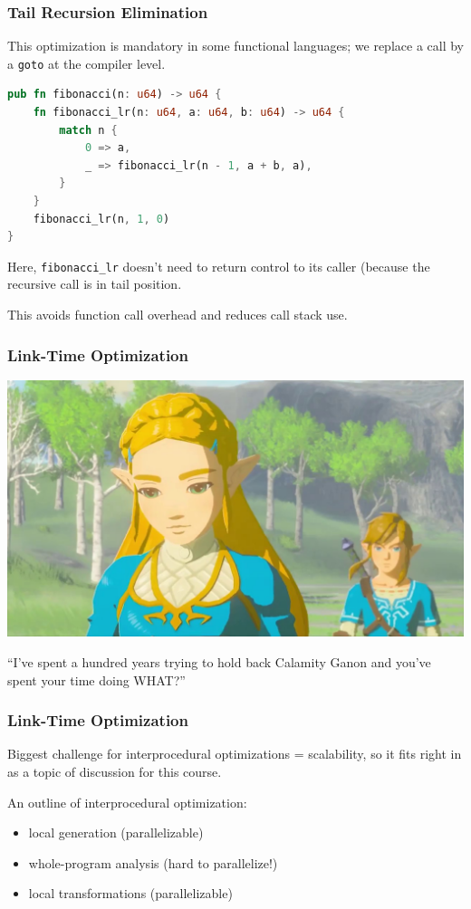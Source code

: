 \begin{frame}[fragile]
\frametitle{Tail Recursion Elimination}

This optimization is mandatory in some functional languages; we replace a call by a {\tt goto} at the compiler level.

{\small
\begin{lstlisting}[language=Rust]
pub fn fibonacci(n: u64) -> u64 {
    fn fibonacci_lr(n: u64, a: u64, b: u64) -> u64 {
        match n {
            0 => a,
            _ => fibonacci_lr(n - 1, a + b, a),
        }
    }
    fibonacci_lr(n, 1, 0)
}
\end{lstlisting}
}
Here, \texttt{fibonacci\_lr} doesn't need to return control to its caller
(because the recursive call is in tail position. 

This avoids function call overhead and reduces call stack use.
\end{frame}


\begin{frame}
\frametitle{Link-Time Optimization}

\begin{center}
	\includegraphics[width=\textwidth]{images/sadzelda.jpg}
\end{center}

``I've spent a hundred years trying to hold back Calamity Ganon and you've spent your time doing WHAT?''

\end{frame}


\begin{frame}
\frametitle{Link-Time Optimization}


Biggest challenge for interprocedural optimizations = scalability, so 
it fits right in as a topic of discussion for this course.

An outline of interprocedural optimization:

\begin{itemize}
\item local generation (parallelizable)
\item whole-program analysis (hard to parallelize!)
\item local transformations (parallelizable)
\end{itemize}

\end{frame}


